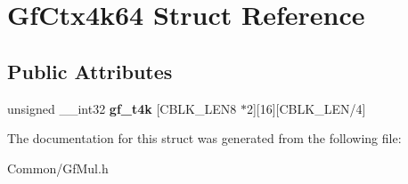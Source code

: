 \hypertarget{struct_gf_ctx4k64}{}\section{Gf\+Ctx4k64 Struct Reference}
\label{struct_gf_ctx4k64}
\subsection*{Public Attributes}
\begin{DoxyCompactItemize}
\item 
\mbox{\label{struct_gf_ctx4k64_ab92b58e5ce880dce48ceefaea9a3947e}} 
unsigned \+\_\+\+\_\+int32 {\bfseries gf\+\_\+t4k} \mbox{[}C\+B\+L\+K\+\_\+\+L\+E\+N8 $\ast$2\mbox{]}\mbox{[}16\mbox{]}\mbox{[}C\+B\+L\+K\+\_\+\+L\+EN/4\mbox{]}
\end{DoxyCompactItemize}


The documentation for this struct was generated from the following file\+:\begin{DoxyCompactItemize}
\item 
Common/Gf\+Mul.\+h\end{DoxyCompactItemize}
